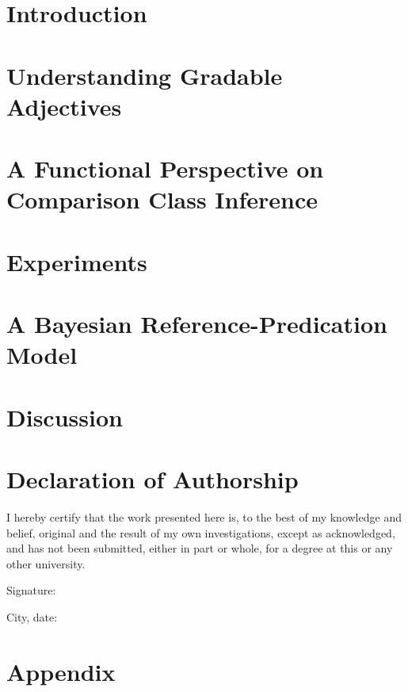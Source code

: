 \documentclass[12pt, twoside, openright]{report}
\begin{document}
\tableofcontents

\chapter{Introduction}
\label{chapter01}


\chapter{Understanding Gradable Adjectives}
\label{chapter02}


\chapter{A Functional Perspective on Comparison Class Inference}
\label{chapter03}


\chapter{Experiments}
\label{chapter04}


\chapter{A Bayesian Reference-Predication Model}
\label{chapter05}


\chapter{Discussion}
\label{chapter06}


\chapter*{Declaration of Authorship}
I hereby certify that the work presented here is, to the best of my knowledge and belief, original and the result of my own investigations, except as acknowledged, and has not been submitted, either in part or whole, for a degree at this or any other university.

\vspace{2cm}
Signature:~\makebox[3in]{\hrulefill}

\vspace{1cm}
City, date:~\makebox[3in]{\hrulefill} 

\appendix
\chapter{Appendix}	
\label{appendix}


\printbibliography
%
\end{document}
